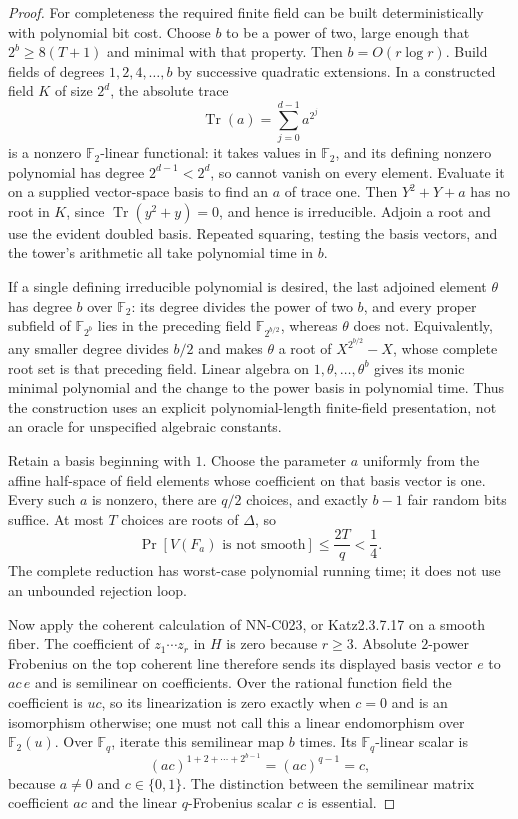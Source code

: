 \begin{proof}
For completeness the required finite field can be built deterministically with polynomial bit cost. Choose $b$ to be a power of two, large enough that $2^b\geq8(T+1)$ and minimal with that property. Then $b=O(r\log r)$. Build fields of degrees $1,2,4,\ldots,b$ by successive quadratic extensions. In a constructed field $K$ of size $2^d$, the absolute trace
\[
 \operatorname{Tr}(a)=\sum_{j=0}^{d-1}a^{2^j}
\]
is a nonzero $\mathbb F_2$-linear functional: it takes values in $\mathbb F_2$, and its defining nonzero polynomial has degree $2^{d-1}<2^d$, so cannot vanish on every element. Evaluate it on a supplied vector-space basis to find an $a$ of trace one. Then $Y^2+Y+a$ has no root in $K$, since $\operatorname{Tr}(y^2+y)=0$, and hence is irreducible. Adjoin a root and use the evident doubled basis. Repeated squaring, testing the basis vectors, and the tower's arithmetic all take polynomial time in $b$.

If a single defining irreducible polynomial is desired, the last adjoined element $\theta$ has degree $b$ over $\mathbb F_2$: its degree divides the power of two $b$, and every proper subfield of $\mathbb F_{2^b}$ lies in the preceding field $\mathbb F_{2^{b/2}}$, whereas $\theta$ does not. Equivalently, any smaller degree divides $b/2$ and makes $\theta$ a root of $X^{2^{b/2}}-X$, whose complete root set is that preceding field. Linear algebra on $1,\theta,\ldots,\theta^b$ gives its monic minimal polynomial and the change to the power basis in polynomial time. Thus the construction uses an explicit polynomial-length finite-field presentation, not an oracle for unspecified algebraic constants.

Retain a basis beginning with $1$. Choose the parameter $a$ uniformly from the affine half-space of field elements whose coefficient on that basis vector is one. Every such $a$ is nonzero, there are $q/2$ choices, and exactly $b-1$ fair random bits suffice. At most $T$ choices are roots of $\Delta$, so
\[
 \Pr[V(F_a)\text{ is not smooth}]\leq\frac{2T}{q}<\frac14.
\]
The complete reduction has worst-case polynomial running time; it does not use an unbounded rejection loop.

Now apply the coherent calculation of NN-C023, or Katz2.3.7.17 on a smooth fiber. The coefficient of $z_1\cdots z_r$ in $H$ is zero because $r\geq3$. Absolute $2$-power Frobenius on the top coherent line therefore sends its displayed basis vector $e$ to $ac\,e$ and is semilinear on coefficients. Over the rational function field the coefficient is $uc$, so its linearization is zero exactly when $c=0$ and is an isomorphism otherwise; one must not call this a linear endomorphism over $\mathbb F_2(u)$. Over $\mathbb F_q$, iterate this semilinear map $b$ times. Its $\mathbb F_q$-linear scalar is
\[
 (ac)^{1+2+\cdots+2^{b-1}}=(ac)^{q-1}=c,
\]
because $a\ne0$ and $c\in\{0,1\}$. The distinction between the semilinear matrix coefficient $ac$ and the linear $q$-Frobenius scalar $c$ is essential.


\end{proof}
